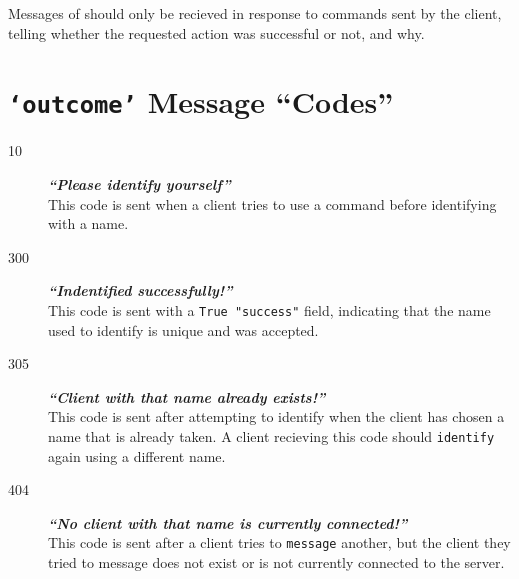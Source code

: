 \documentclass[12pt,letterpaper]{article}
\begin{document}
Messages of \outcome  should only be recieved in response to commands sent by the client, telling whether the requested action was successful or not, and why.


\section{\texttt{`outcome'} Message ``Codes''}
\begin{description}
  \item[10] \textbf{\textit{``Please identify yourself''}} \\
    This code is sent when a client tries to use a command before identifying with a name.
  \item[300] \textbf{\textit{``Indentified successfully!''}} \\
    This code is sent with a \texttt{True "success"} field, indicating that the name used to identify is unique and was accepted.
  \item[305] \textbf{\textit{``Client with that name already exists!''}} \\
    This code is sent after attempting to identify when the client has chosen a name that is already taken. A client recieving this code should \texttt{identify} again using a different name.
  \item[404] \textbf{\textit{``No client with that name is currently connected!''}} \\
    This code is sent after a client tries to \texttt{message} another, but the client they tried to message does not exist or is not currently connected to the server.
\end{description}
\end{document}

